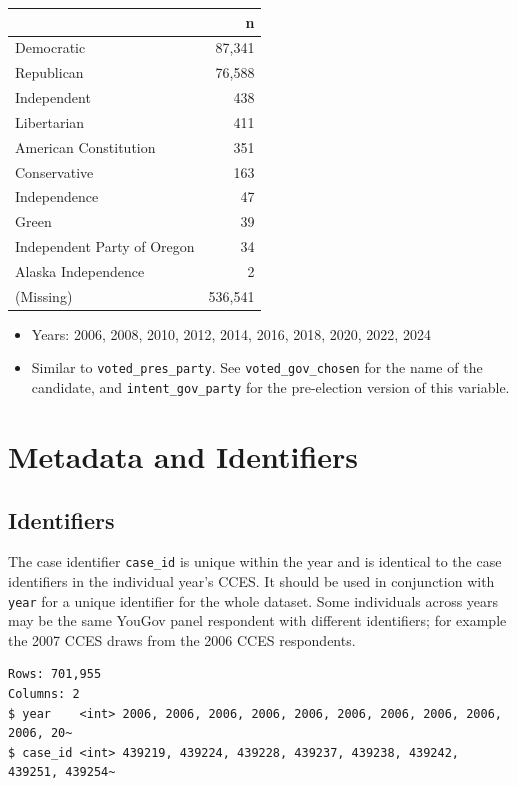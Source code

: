 \documentclass[10pt,article,oneside]{memoir}
\begin{document}
\begin{table}[H]
\centering
\begin{tabular}[t]{lr}
\toprule
 & n\\
\midrule
Democratic & 87,341\\
Republican & 76,588\\
Independent & 438\\
Libertarian & 411\\
American Constitution & 351\\
Conservative & 163\\
Independence & 47\\
Green & 39\\
Independent Party of Oregon & 34\\
Alaska Independence & 2\\
(Missing) & 536,541\\
\bottomrule
\end{tabular}
\end{table}

\begin{itemize}
\tightlist
\item
  Years: 2006, 2008, 2010, 2012, 2014, 2016, 2018, 2020, 2022, 2024
\item
  Similar to \texttt{voted\_pres\_party}. See
  \texttt{voted\_gov\_chosen} for the name of the candidate, and
  \texttt{intent\_gov\_party} for the pre-election version of this
  variable.
\end{itemize}

\newpage

\section{Metadata and Identifiers}\label{metadata-and-identifiers}

\subsection{Identifiers}\label{identifiers}

The case identifier \texttt{case\_id} is unique within the year and is
identical to the case identifiers in the individual year's CCES. It
should be used in conjunction with \texttt{year} for a unique identifier
for the whole dataset. Some individuals across years may be the same
YouGov panel respondent with different identifiers; for example the 2007
CCES draws from the 2006 CCES respondents.

\begin{verbatim}
Rows: 701,955
Columns: 2
$ year    <int> 2006, 2006, 2006, 2006, 2006, 2006, 2006, 2006, 2006, 2006, 20~
$ case_id <int> 439219, 439224, 439228, 439237, 439238, 439242, 439251, 439254~
\end{verbatim}
\end{document}
